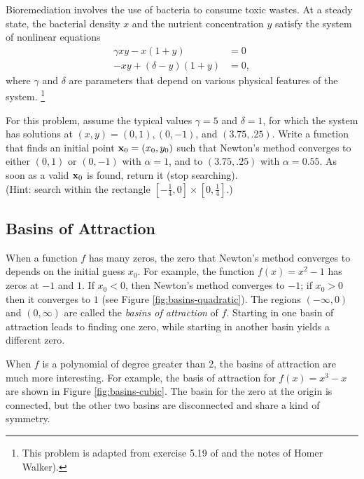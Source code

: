 \begin{problem}
Bioremediation involves the use of bacteria to consume toxic wastes.
At a steady state, the bacterial density $x$ and the nutrient concentration $y$ satisfy the system of nonlinear equations
\begin{align*}
\gamma xy - x(1 + y) &= 0 \\
-xy + (\delta - y)(1 + y) &= 0,
\end{align*}
where $\gamma$ and $\delta$ are parameters that depend on various physical features of the system.%
\footnote{This problem is adapted from exercise 5.19 of \cite{heath2002scientific} and the notes of Homer Walker).}

For this problem, assume the typical values $\gamma = 5$ and $\delta = 1$, for which the system has solutions at $(x, y) = (0, 1), (0, -1)$, and $(3.75, .25)$.
Write a function that finds an initial point $\mathbf{x}_0 = (x_0,y_0)$ such that Newton's method converges to either $(0, 1)$ or $(0, -1)$ with $\alpha = 1$, and to $(3.75, .25)$ with $\alpha = 0.55$.
As soon as a valid $\mathbf{x}_0$ is found, return it (stop searching).
\\(Hint: search within the rectangle $[-\frac{1}{4},0]\times[0,\frac{1}{4}]$.)
\end{problem}

\subsection*{Basins of Attraction} %

When a function $f$ has many zeros, the zero that Newton's method converges to depends on the initial guess $x_0$.
For example, the function $f(x)=x^2-1$ has zeros at $-1$ and $1$.
If $x_0<0$, then Newton's method converges to $-1$; if $x_0 > 0$ then it converges to $1$ (see Figure \ref{fig:basins-quadratic}).
The regions $(-\infty, 0)$ and $(0, \infty)$ are called the \emph{basins of attraction} of $f$.
Starting in one basin of attraction leads to finding one zero, while starting in another basin yields a different zero.

When $f$ is a polynomial of degree greater than 2, the basins of attraction are much more interesting.
For example, the basis of attraction for $f(x) = x^3-x$ are shown in Figure \ref{fig:basins-cubic}.
The basin for the zero at the origin is connected, but the other two basins are disconnected and share a kind of symmetry.

